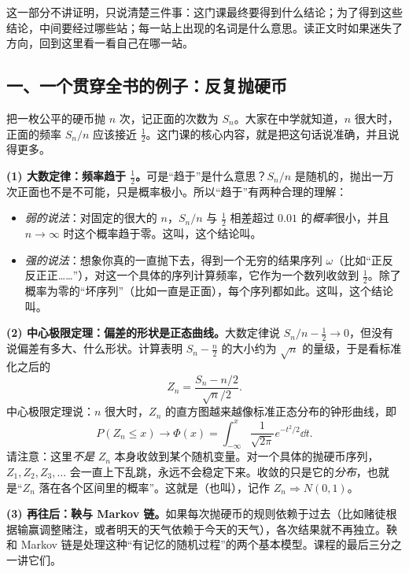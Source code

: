 
这一部分不讲证明，只说清楚三件事：这门课最终要得到什么结论；为了得到这些结论，中间要经过哪些站；每一站上出现的名词是什么意思。读正文时如果迷失了方向，回到这里看一看自己在哪一站。

\subsection*{一、一个贯穿全书的例子：反复抛硬币}

把一枚公平的硬币抛 $n$ 次，记正面的次数为 $S_n$。大家在中学就知道，$n$ 很大时，正面的频率 $S_n/n$ 应该接近 $\frac12$。这门课的核心内容，就是把这句话说准确，并且说得更多。

\textbf{(1) 大数定律：频率趋于 $\frac12$。}可是“趋于”是什么意思？$S_n/n$ 是随机的，抛出一万次正面也不是不可能，只是概率极小。所以“趋于”有两种合理的理解：
\begin{itemize}
\item \emph{弱的说法}：对固定的很大的 $n$，$S_n/n$ 与 $\frac12$ 相差超过 $0.01$ 的\emph{概率}很小，并且 $n\to\infty$ 时这个概率趋于零。这叫，这个结论叫。
\item \emph{强的说法}：想象你真的一直抛下去，得到一个无穷的结果序列 $\omega$（比如“正反反正正……”），对这一个具体的序列计算频率，它作为一个数列收敛到 $\frac12$。除了概率为零的“坏序列”（比如一直是正面），每个序列都如此。这叫，这个结论叫。
\end{itemize}

\textbf{(2) 中心极限定理：偏差的形状是正态曲线。}大数定律说 $S_n/n-\frac12\to0$，但没有说偏差有多大、什么形状。计算表明 $S_n-\frac n2$ 的大小约为 $\sqrt n$ 的量级，于是看标准化之后的
\[
Z_n=\frac{S_n-n/2}{\sqrt n/2}.
\]
中心极限定理说：$n$ 很大时，$Z_n$ 的直方图越来越像标准正态分布的钟形曲线，即
\[
P(Z_n\leqslant x)\to\Phi(x)=\int_{-\infty}^x\frac1{\sqrt{2\pi}}e^{-t^2/2}\dd t .
\]
请注意：这里\emph{不是} $Z_n$ 本身收敛到某个随机变量。对一个具体的抛硬币序列，$Z_1,Z_2,Z_3,\dots$ 会一直上下乱跳，永远不会稳定下来。收敛的只是它的\emph{分布}，也就是“$Z_n$ 落在各个区间里的概率”。这就是（也叫），记作 $Z_n\Rightarrow N(0,1)$。

\textbf{(3) 再往后：鞅与 Markov 链。}如果每次抛硬币的规则依赖于过去（比如赌徒根据输赢调整赌注，或者明天的天气依赖于今天的天气），各次结果就不再独立。鞅和 Markov 链是处理这种“有记忆的随机过程”的两个基本模型。课程的最后三分之一讲它们。

